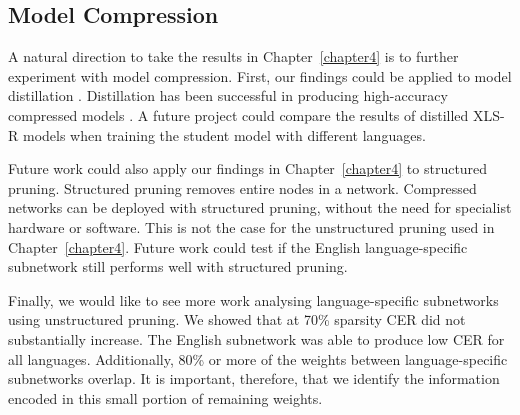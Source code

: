 \subsection{Model Compression}

A natural direction to take the results in Chapter~\ref{chapter4} is to further experiment with model compression. First, our findings could be applied to model distillation \cite{distillation}. Distillation has been successful in producing high-accuracy compressed models \cite{chang2022distilhubert, sanh2019distilbert}. A future project could compare the results of distilled XLS-R models when training the student model with different languages. 

Future work could also apply our findings in Chapter~\ref{chapter4} to structured pruning.  Structured pruning removes entire nodes in a network. Compressed networks can be deployed with structured pruning, without the need for specialist hardware or software. This is not the case for the unstructured pruning used in Chapter~\ref{chapter4}. Future work could test if the English language-specific subnetwork still performs well with structured pruning.

Finally, we would like to see more work analysing language-specific subnetworks using unstructured pruning. We showed that at 70\% sparsity CER did not substantially increase. The English subnetwork was able to produce low CER for all languages. Additionally, 80\% or more of the weights between language-specific subnetworks overlap. It is important, therefore, that we identify the information encoded in this small portion of remaining weights. 



